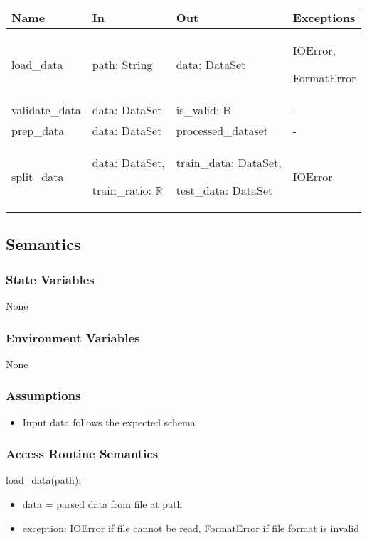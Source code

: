 \documentclass[12pt, titlepage]{article}
\begin{document}
\begin{center}
\begin{tabular}{p{2cm} p{4cm} p{4cm} p{2cm}}
\hline
\textbf{Name} & \textbf{In} & \textbf{Out} & \textbf{Exceptions} \\
\hline
load\_data & path: String & data: DataSet & IOError,

FormatError\\
\hline
validate\_data & data: DataSet & is\_valid: $\mathbb{B}$ & -\\
\hline
prep\_data & data: DataSet & processed\_dataset & - \\
\hline
split\_data & data: DataSet,

train\_ratio: $\mathbb{R}$ & train\_data: DataSet,

test\_data: DataSet & IOError \\
\hline
\end{tabular}
\end{center}

\subsection{Semantics}

\subsubsection{State Variables}
None

\subsubsection{Environment Variables}

None

\subsubsection{Assumptions}

\begin{itemize}
  \item Input data follows the expected schema
\end{itemize}

\subsubsection{Access Routine Semantics}

\noindent load\_data(path):
\begin{itemize}
\item data = parsed data from file at path
\item exception: IOError if file cannot be read, FormatError if file format is invalid
\end{itemize}
\end{document}
